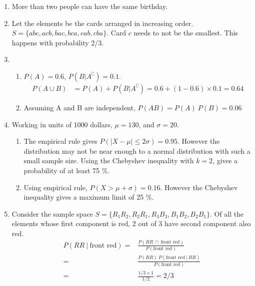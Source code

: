 \begin{enumerate}
	\item More than two people can have the same birthday.
	
	\item Let the elements be the cards arranged in increasing order. \\
	$ S = \{ abc, acb, bac, bca, cab, cba \} $. Card $ c $ needs to not be the smallest. This happens with probability 2/3.
	
	\item \begin{enumerate}
		\item 	$ P(A) = 0.6 $, $ P(B|A^\complement) = 0.1 $. \\
		\begin{align}
			P(A \cup B) &= P(A) + P(B|A^\complement) = 0.6 + (1 - 0.6) \times 0.1 = 0.64
		\end{align}
		
		\item Assuming A and B are independent, $ P(AB) = P(A)\ P(B) = 0.06$ \\
	\end{enumerate}
	
	\item Working in units of 1000 dollars, $ \mu = 130 $, and $ \sigma = 20 $. 
	\begin{enumerate}
		\item The empirical rule gives $ P(|X - \mu| \leq 2 \sigma) =  0.95$. However the distribution may not be near enough to a normal distribution with such a small sample size. Using the Chebyshev inequality with $ k = 2 $, gives a probability of at least 75 \%. \\
		
		\item Using empirical rule, $ P(X > \mu + \sigma) = 0.16 $. However the Chebyshev inequality gives a maximum limit of 25 \%.\\
	\end{enumerate} 
	
	\item Consider the sample space $S = \{ R_1 R_2, R_2 R_1, R_3 B_3, B_1 B_2, B_2 B_1 \} $. Of all the elements whose first component is red, 2 out of 3 have second component also red. \\
	\begin{subequations}
		\begin{align}
			P(RR\ |\ \text{front red}) =& \frac{P(RR \ \cap \  \text{front red})}{P(\text{front red})} \\
			=& \frac{P(RR) \ P(\text{front red}\ |\ RR)}{P(\text{front red})} \\
			=& \frac{1/3 \times 1}{1/2} = 2/3
		\end{align}
	\end{subequations} \\
	

\end{enumerate}
